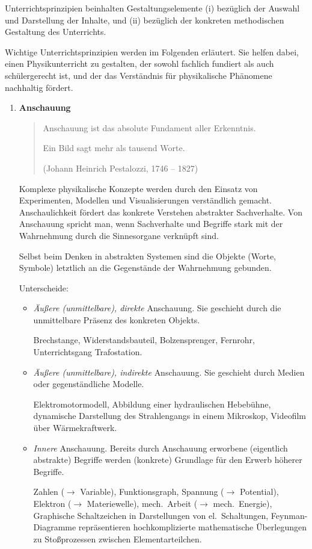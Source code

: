 \bip
Unterrichtsprinzipien beinhalten Gestaltungselemente (i) bez\"{u}glich der Auswahl und Darstellung der Inhalte, und (ii) bez\"{u}glich der konkreten methodischen Gestaltung des Unterrichts.

\bip
Wichtige Unterrichtsprinzipien werden im Folgenden erl\"{a}utert. Sie helfen dabei, einen Physikunterricht zu gestalten, der sowohl fachlich fundiert als auch sch\"{u}lergerecht ist, und der das Verst\"{a}ndnis f\"{u}r physikalische Ph\"{a}nomene nachhaltig f\"{o}rdert.

\begin{enumerate}
	\item \textbf{Anschauung}
	\begin{quote}
		Anschauung ist das absolute Fundament aller Erkenntnis.

		\mip
		Ein Bild sagt mehr als tausend Worte.

		\mip
		(Johann Heinrich Pestalozzi, 1746 -- 1827)
	\end{quote}

	Komplexe physikalische Konzepte werden durch den Einsatz von Experimenten, Modellen und Visualisierungen verst\"{a}ndlich gemacht. Anschaulichkeit f\"{o}rdert das konkrete Verstehen abstrakter Sachverhalte. Von Anschauung spricht man, wenn Sachverhalte und Begriffe stark mit der Wahrnehmung durch die Sinnesorgane verkn\"{u}pft sind.

	Selbst beim Denken in abstrakten Systemen sind die Objekte (Worte, Symbole) letztlich an die Gegenst\"{a}nde der Wahrnehmung gebunden.

	Unterscheide:
	\begin{itemize}
		\item {\it \"{A}u{\ss}ere (unmittelbare), direkte } Anschauung.
		Sie geschieht durch die unmittelbare Pr\"{a}senz des konkreten Objekts.
		\begin{beisp2}
			Brechstange, Widerstandsbauteil, Bolzensprenger, Fernrohr, Unterrichtsgang Trafostation.
		\end{beisp2}
		
		\item {\it \"{A}u{\ss}ere (unmittelbare), indirekte } Anschauung.
		Sie geschieht durch Medien oder gegenst\"{a}ndliche Modelle.
		\begin{beisp2}
			Elektromotormodell, Abbildung einer hydraulischen Hebeb\"{u}hne,
		dynamische Darstellung des Strahlengangs in einem Mikroskop,
		Videofilm \"{u}ber W\"{a}rmekraftwerk.
		\end{beisp2}
		\item {\it Innere}  Anschauung.
		Bereits durch Anschauung erworbene (eigentlich abstrakte) Begriffe werden (konkrete) Grundlage f\"{u}r den Erwerb h\"{o}herer Begriffe.
		\begin{beisp2}
			Zahlen ($\to$ Variable), Funktionsgraph, Spannung ($\to$ Potential), Elektron ($\to$ Materiewelle), mech.\ Arbeit ($\to$ mech.\ Energie), Graphische Schaltzeichen in Darstellungen von el.\ Schaltungen, Feynman-Diagramme repr\"{a}sentieren hochkomplizierte mathematische \"{U}berlegungen zu Sto{\ss}prozessen zwischen Elementar\-teilchen.
		\end{beisp2}


\end{itemize}
\end{enumerate}
